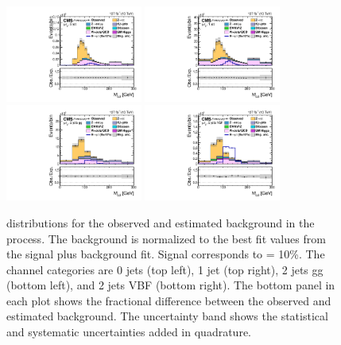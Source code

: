 \begin{figure}[htbp!]
  \centering
  \includegraphics[width=0.4\textwidth]{plots/chapter9/CB/mutau/0jet.pdf}
  \includegraphics[width=0.4\textwidth]{plots/chapter9/CB/mutau/1jet.pdf} \\
  \includegraphics[width=0.4\textwidth]{plots/chapter9/CB/mutau/2jet_gg.pdf}
  \includegraphics[width=0.4\textwidth]{plots/chapter9/CB/mutau/2jet_vbf.pdf} \\
  \caption{\mcol distributions for the observed and estimated background in the \muhad process. The background is normalized to the best fit values from the signal plus background fit. Signal corresponds to \BHmt = 10\%. The \muhad channel categories are 0 jets (top left), 1 jet (top right), 2 jets gg (bottom left), and 2 jets VBF (bottom right). The bottom panel in each plot shows the fractional difference between the observed and estimated background. The uncertainty band shows the statistical and systematic uncertainties added in quadrature.}
  \label{fig:mcol_muhad}
\end{figure}

